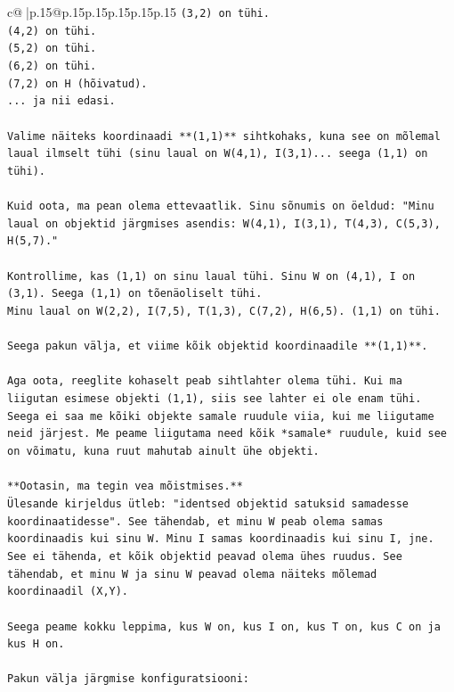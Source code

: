 \documentclass{article}
\begin{document}
{\begin{supertabular}{c@{$\;$}|p{.15\linewidth}@{}p{.15\linewidth}p{.15\linewidth}p{.15\linewidth}p{.15\linewidth}p{.15\linewidth}}
{{{\texttt{(3,2) on tühi.} \\
\texttt{(4,2) on tühi.} \\
\texttt{(5,2) on tühi.} \\
\texttt{(6,2) on tühi.} \\
\texttt{(7,2) on H (hõivatud).} \\
\texttt{... ja nii edasi.} \\
\\ 
\texttt{Valime näiteks koordinaadi **(1,1)** sihtkohaks, kuna see on mõlemal laual ilmselt tühi (sinu laual on W(4,1), I(3,1)... seega (1,1) on tühi).} \\
\\ 
\texttt{Kuid oota, ma pean olema ettevaatlik. Sinu sõnumis on öeldud: "Minu laual on objektid järgmises asendis: W(4,1), I(3,1), T(4,3), C(5,3), H(5,7)."} \\
\\ 
\texttt{Kontrollime, kas (1,1) on sinu laual tühi. Sinu W on (4,1), I on (3,1). Seega (1,1) on tõenäoliselt tühi.} \\
\texttt{Minu laual on W(2,2), I(7,5), T(1,3), C(7,2), H(6,5). (1,1) on tühi.} \\
\\ 
\texttt{Seega pakun välja, et viime kõik objektid koordinaadile **(1,1)**.} \\
\\ 
\texttt{Aga oota, reeglite kohaselt peab sihtlahter olema tühi. Kui ma liigutan esimese objekti (1,1), siis see lahter ei ole enam tühi. Seega ei saa me kõiki objekte samale ruudule viia, kui me liigutame neid järjest. Me peame liigutama need kõik *samale* ruudule, kuid see on võimatu, kuna ruut mahutab ainult ühe objekti.} \\
\\ 
\texttt{**Ootasin, ma tegin vea mõistmises.**} \\
\texttt{Ülesande kirjeldus ütleb: "identsed objektid satuksid samadesse koordinaatidesse". See tähendab, et minu W peab olema samas koordinaadis kui sinu W. Minu I samas koordinaadis kui sinu I, jne. See ei tähenda, et kõik objektid peavad olema ühes ruudus. See tähendab, et minu W ja sinu W peavad olema näiteks mõlemad koordinaadil (X,Y).} \\
\\ 
\texttt{Seega peame kokku leppima, kus W on, kus I on, kus T on, kus C on ja kus H on.} \\
\\ 
\texttt{Pakun välja järgmise konfiguratsiooni:} \\
}}}
\end{supertabular}}
\end{document}
